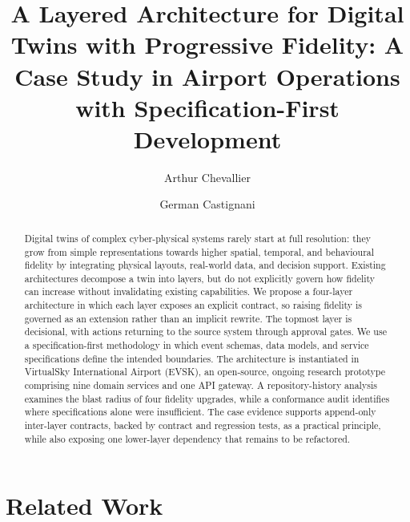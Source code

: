 \documentclass[runningheads]{llncs}
\begin{document}
%
\title{A Layered Architecture for Digital Twins with Progressive Fidelity: A Case Study in Airport Operations with Specification-First Development}
%
%
\author{Arthur Chevallier \and German Castignani}
%
%
%
\maketitle              %
%
\begin{abstract}
Digital twins of complex cyber-physical systems rarely start at full resolution: they grow from simple representations towards higher spatial, temporal, and behavioural fidelity by integrating physical layouts, real-world data, and decision support. Existing architectures decompose a twin into layers, but do not explicitly govern how fidelity can increase without invalidating existing capabilities. We propose a four-layer architecture in which each layer exposes an explicit contract, so raising fidelity is governed as an extension rather than an implicit rewrite. The topmost layer is decisional, with actions returning to the source system through approval gates. We use a specification-first methodology in which event schemas, data models, and service specifications define the intended boundaries. The architecture is instantiated in VirtualSky International Airport (EVSK), an open-source, ongoing research prototype comprising nine domain services and one API gateway. A repository-history analysis examines the blast radius of four fidelity upgrades, while a conformance audit identifies where specifications alone were insufficient. The case evidence supports append-only inter-layer contracts, backed by contract and regression tests, as a practical principle, while also exposing one lower-layer dependency that remains to be refactored.

\end{abstract}
%
%
%


\section{Related Work}\label{sec:related}
\end{document}

